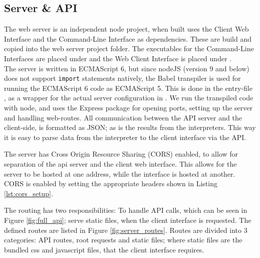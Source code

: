 



\subsection*{Server \& API}

The web server is an independent node project, when built uses the Client Web Interface and the Command-Line Interface as dependencies.
These are build and copied into the web server project folder.
The executables for the Command-Line Interfaces are placed under  and the Web Client Interface is placed under .\\

\noindent
The server is written in ECMAScript 6, but since nodeJS (version 9 and below) does not support \texttt{import} statements natively, the Babel transpiler is used for running the ECMAScript 6 code as ECMAScript 5.
This is done in the entry-file , as a wrapper for the actual server configuration in .
We run the transpiled code with node, and uses the Express package for opening ports, setting up the server and handling web-routes.
All communication between the API server and the client-side, is formatted as JSON; as is the results from the interpreters.
This way it is easy to parse data from the interpreter to the client interface via the API.

The server has Cross Origin Resource Sharing (CORS) enabled, to allow for separation of the api server and the client web interface.
This allows for the server to be hosted at one address, while the interface is hosted at another.
CORS is enabled by setting the appropriate headers shown in Listing \ref{lst:cors_setup}.



The routing has two responsibilities: To handle API calls, which can be seen in Figure \ref{fig:full_api}; serve static files, when the client interface is requested. The defined routes are listed in Figure \ref{fig:server_routes}. Routes are divided into 3 categories: API routes, root requests and static files; where static files are the bundled css and javascript files, that the client interface requires.\\

